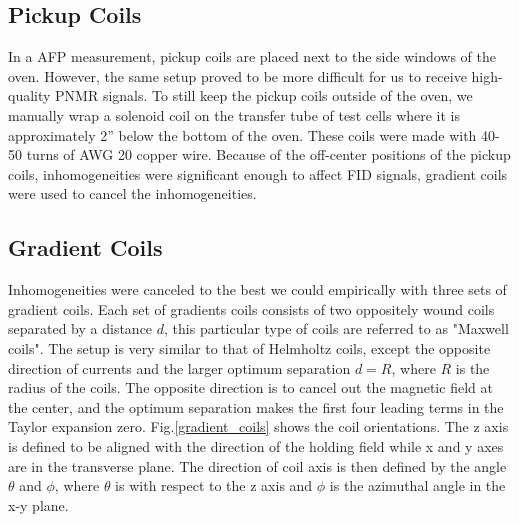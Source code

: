 \subsection{Pickup Coils}

In a AFP measurement, pickup coils are placed next to the side windows of the oven. However, the same setup proved to be more difficult for us to receive high-quality PNMR signals. To still keep the pickup coils outside of the oven, we manually wrap a solenoid coil on the transfer tube of test cells where it is approximately 2'' below the bottom of the oven. These coils were made with 40-50 turns of AWG 20 copper wire. Because of the off-center positions of the pickup coils, inhomogeneities were significant enough to affect FID signals, gradient coils were used to cancel the inhomogeneities.

\subsection{Gradient Coils}

Inhomogeneities were canceled to the best we could empirically with three sets of gradient coils. Each set of gradients coils consists of two oppositely wound coils separated by a distance $d$, this particular type of coils are referred to as "Maxwell coils". The setup is very similar to that of Helmholtz coils, except the opposite direction of currents and the larger optimum separation $d=R$, where $R$ is the radius of the coils. The opposite direction is to cancel out the magnetic field at the center, and the optimum separation makes the first four leading terms in the Taylor expansion zero\cite{Callaghan}. Fig.\ref{gradient_coils} shows the coil orientations. The z axis is defined to be aligned with the direction of the holding field while x and y axes are in the transverse plane. The direction of coil axis is then defined by the angle $\theta$ and $\phi$, where $\theta$ is with respect to the z axis and $\phi$ is the azimuthal angle in the x-y plane.

